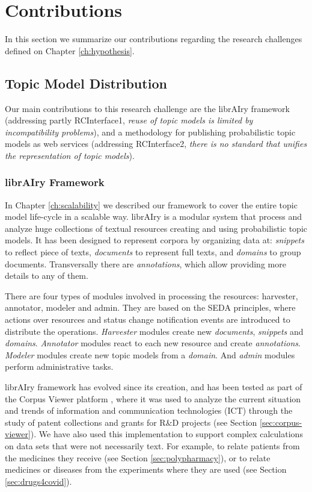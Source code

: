 \section{Contributions}

In this section we summarize our contributions regarding the research challenges defined on Chapter \ref{ch:hypothesis}.


\subsection{Topic Model Distribution}
Our main contributions to this research challenge are the librAIry framework (addressing partly RCInterface1, \textit{reuse of topic models is limited by incompatibility problems}), and a methodology for publishing probabilistic topic models as web services (addressing RCInterface2, \textit{there is no standard that unifies the representation of topic models}).

\subsubsection{librAIry Framework}

In Chapter \ref{ch:scalability} we described our framework to cover the entire topic model life-cycle in a scalable way. librAIry is a modular system that process and analyze huge collections of textual resources creating and using probabilistic topic models. It has been designed to represent corpora by organizing data at: \textit{snippets} to reflect piece of texts, \textit{documents} to represent full texts, and \textit{domains} to group documents. Transversally there are \textit{annotations}, which allow providing more details to any of them.

There are four types of modules involved in processing the resources: harvester, annotator, modeler and admin. They are based on the SEDA principles, where actions over resources and status change notification events are introduced to distribute the operations. \textit{Harvester} modules create new \textit{documents}, \textit{snippets} and \textit{domains}. \textit{Annotator} modules react to each new resource and create \textit{annotations}. \textit{Modeler} modules create new topic models from a \textit{domain}. And \textit{admin} modules perform administrative tasks.

librAIry framework has evolved since its creation, and has been tested as part of the Corpus Viewer platform \citep{Samy2019}, where it was used to analyze the current situation and trends of information and communication technologies (ICT) through the study of patent collections and grants for R\&D projects (see Section \ref{sec:corpus-viewer}). We have also used this implementation to support complex calculations on data sets that were not necessarily text. For example, to relate patients from the medicines they receive \citep{Badenes-Olmedo2019c} (see Section 	\ref{sec:polypharmacy}), or to relate medicines or diseases from the experiments where they are used (see Section \ref{sec:drugs4covid}).

